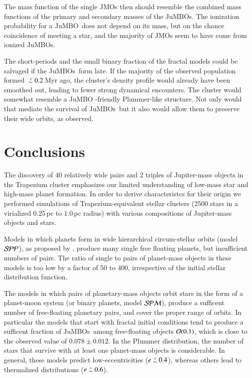 \documentclass[submission,phys]{lib/SciPost}
\def\apgt{\ {\raise-.5ex\hbox{$\buildrel>\over\sim$}}\ }
\def\aplt{\ {\raise-.5ex\hbox{$\buildrel<\over\sim$}}\ }
\newcommand{\jumbo}{\mbox{JuMBO}}
\newcommand{\jumbos}{\mbox{JuMBOs}}
\begin{document}
The mass function of the single JMOs then
should resemble the combined mass functions of the primary and
secondary masses of the \jumbos. The ionization probability for a
\jumbo\, does not depend on its mass, but on the chance coincidence of
meeting a star, and the majority of JMOs seem to have come from
ionized \jumbos.  

The short-periods and the small binary fraction of the fractal models
could be salvaged if the \jumbos\, form late. If the majority of the
observed population formed $\aplt 0.2$\,Myr ago, the cluster's density
profile would already have been smoothed out, leading to fewer strong
dynamical encounters. The cluster would somewhat resemble a \jumbo
-friendly Plummer-like structure. Not only would that mediate the
survival of \jumbos\, but it also would allow them to preserve their
wide orbits, as observed.


\section{Conclusions}\label{Sect:Conclusions}

   
The discovery of 40 relatively wide pairs and 2 triples of
Jupiter-mass objects in the Trapezium cluster emphasizes our limited
understanding of low-mass star and high-mass planet formation. In
order to derive characteristcs for their origin we performed
simulations of Trapezium-equivalent stellar clusters (2500 stars in a
virialized $0.25$\,pc to $1.0$\,pc radius) with various compositions
of Jupiter-mass objects and stars.

Models in which planets form in wide hierarchical circum-stellar
orbits (model ${\cal SPP}$), as proposed by
\cite{2023arXiv231006016W}, produce many single free floating planets,
but insufficient numbers of pairs. The ratio of single to pairs of
planet-mass objects in these models is too low by a factor of 50 to
400, irrespective of the initial stellar distribution function.

The models in which pairs of planetary-mass objects orbit stars in the
form of a planet-moon system (or binary planets, model ${\cal SPM}$),
produce a sufficent number of free-floating planetary pairs, and cover
the proper range of orbits.  In particular the models that start with
fractal initial conditions tend to produce a sufficent fraction of
\jumbos\, among free-floating objects ${\cal O}(0.1)$, which is
close to the observed value of $0.078\pm0.012$. In the Plummer
distribution, the number of stars that survive with at least one
planet-mass objects is considerable. In general, these models predict
low-eccentricities ($e\aplt 0.4$), whereas others lead to thermalized
distributions ($e\apgt 0.6$).
\end{document}
